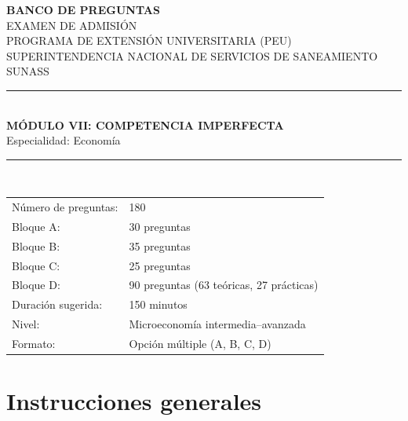 \documentclass[11pt,a4paper]{article}
\begin{document}
\begin{titlepage}
\thispagestyle{empty}
\centering
\backboneportadaheader

{\Large\bfseries BANCO DE PREGUNTAS}\\[0.35cm]
{\large EXAMEN DE ADMISIÓN}\\[0.15cm]
{\large PROGRAMA DE EXTENSIÓN UNIVERSITARIA (PEU)}\\[0.15cm]
{\large SUPERINTENDENCIA NACIONAL DE SERVICIOS DE SANEAMIENTO}\\[0.05cm]
{\large SUNASS}\\[1.0cm]

\rule{\linewidth}{0.9pt}\\[0.55cm]
{\LARGE\bfseries MÓDULO VII: COMPETENCIA IMPERFECTA}\\[0.35cm]
{\large Especialidad: Economía}\\[0.55cm]
\rule{\linewidth}{0.9pt}\\[1.0cm]

\begin{tabular}{ll}
\toprule
Número de preguntas: & 180 \\
Bloque A: & 30 preguntas \\
Bloque B: & 35 preguntas \\
Bloque C: & 25 preguntas \\
Bloque D: & 90 preguntas (63 teóricas, 27 prácticas) \\
Duración sugerida: & 150 minutos \\
Nivel: & Microeconomía intermedia--avanzada \\
Formato: & Opción múltiple (A, B, C, D) \\
\bottomrule
\end{tabular}

\vfill
\backboneportadafooter
\end{titlepage}

\section*{Instrucciones generales}
\end{document}
